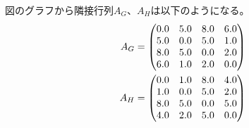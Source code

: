 図のグラフから隣接行列$A_G$、$A_H$は以下のようになる。
\begin{eqnarray}
  A_G=\begin{pmatrix}
    0.0 & 5.0 & 8.0 & 6.0 \\
    5.0 & 0.0 & 5.0 & 1.0 \\
    8.0 & 5.0 & 0.0 & 2.0 \\
    6.0 & 1.0 & 2.0 & 0.0
  \end{pmatrix} \notag \\
  A_H=\begin{pmatrix}
    0.0 & 1.0 & 8.0 & 4.0 \\
    1.0 & 0.0 & 5.0 & 2.0 \\
    8.0 & 5.0 & 0.0 & 5.0 \\
    4.0 & 2.0 & 5.0 & 0.0
  \end{pmatrix} \notag
\end{eqnarray}

